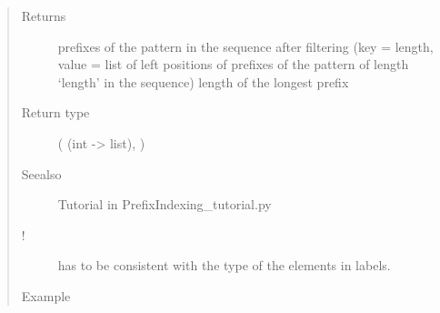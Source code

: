 \documentclass[letterpaper,10pt,english]{sphinxmanual}
\begin{document}
\begin{fulllineitems}
\begin{quote}
\begin{description}
\item[{Returns}] \leavevmode
prefixes of the pattern in the sequence after filtering (key = length, value = list of left positions of prefixes of the pattern of length ‘length’ in the sequence)  length of the longest prefix

\item[{Return type}] \leavevmode
{} ( (int -\textgreater{} list), )

\item[{Seealso}] \leavevmode
Tutorial in PrefixIndexing\_tutorial.py

\item[{!}] \leavevmode
{} has to be consistent with the type of the elements in labels.

\item[{Example}] \leavevmode
\end{description}\end{quote}


\end{fulllineitems}
\end{document}
